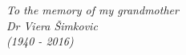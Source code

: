 \begin{center}
    \thispagestyle{empty}
    \vspace*{\fill}
    \textit{To the memory of my grandmother \\
                Dr Viera \v{S}imkovic \\
                       (1940 - 2016)
           }
    \vspace*{\fill}
\end{center}
